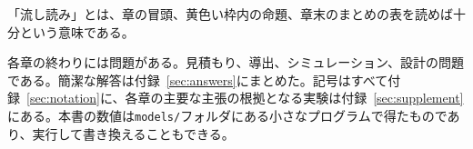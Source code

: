 「流し読み」とは、章の冒頭、黄色い枠内の命題、章末のまとめの表を読めば十分という意味である。

各章の終わりには問題がある。見積もり、導出、シミュレーション、設計の問題である。簡潔な解答は付録~\ref{sec:answers}にまとめた。記号はすべて付録~\ref{sec:notation}に、各章の主要な主張の根拠となる実験は付録~\ref{sec:supplement}にある。本書の数値は\texttt{models/}フォルダにある小さなプログラムで得たものであり、実行して書き換えることもできる。

